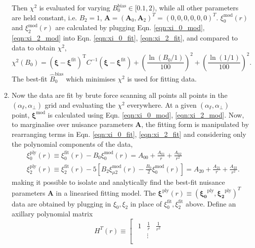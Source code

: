 \documentclass[fleqn,usenatbib]{mnras}
\begin{document}
\begin{enumerate}
			Then $\chi^2$ is evaluated for varying $B^\text{bias}_0 \in [0.1, 2)$, while all other parameters are held constant, i.e. $B_2=1$, $\bm{A} = (\bm{A}_0, \bm{A}_2)^T = (0, 0, 0, 0, 0, 0)^T$. $ \xi^\text{mod} _0 (r)$ and $\xi^\text{mod} _2 (r)$ are calculated by plugging Eqn. \ref{eqn:xi_0_mod}, \ref{eqn:xi_2_mod} into Eqn. \ref{eqn:xi_0_fit}, \ref{eqn:xi_2_fit}, and compared to data to obtain $\chi^2$,
			\begin{equation}
				\chi^2 (B_0) = (\bm{\xi} - \bm{\xi}^\text{fit})^\text{T} C^{-1} (\bm{\xi} - \bm{\xi}^\text{fit}) + \left( \frac{\ln(B_0/1)}{100} \right) ^2
				+ \left( \frac{\ln(1/1)}{100} \right) ^2 .
			\end{equation}
			The best-fit $\hat{B}^\text{bias}_0$ which minimises $\chi^2$ is used for fitting data.
			
			\item 
			Now the data are fit by brute force scanning all points all points in the $(\alpha_\varparallel, \alpha_\perp)$ grid and evaluating the $\chi^2$ everywhere. At a given $(\alpha_\varparallel, \alpha_\perp)$ point, $\bm{\xi}^\text{mod}$ is calculated using Eqn. \ref{eqn:xi_0_mod}, \ref{eqn:xi_2_mod}. Now, to marginalise over nuisance parameters $\bm{A}$, the fitting form is manipulated by rearranging terms in Eqn. \ref{eqn:xi_0_fit}, \ref{eqn:xi_2_fit} and considering only the polynomial components of the data,
			\begin{align}
				& \xi_0^\text{ply} (r) \equiv \xi _0^\text{fit} (r) - B_0 \xi_0^\text{mod}(r) =  A_{00} + \frac{A_{01}}{r} + \frac{A_{02}}{r^2} \\
				& \xi_2^\text{ply} (r) \equiv \xi _2^\text{fit} (r) - 5 \left[ B_2 \xi_{\mu 2}^\text{mod} (r) - \frac{B_0}{2} \xi_0^\text{mod}  (r) \right] = A_{20} + \frac{A_{21}}{r} + \frac{A_{22}}{r^2} .
			\end{align}
			making it possible to isolate and analytically find the best-fit nuisance parameters $\bm{A}$ in a linearised fitting model. The $\bm{\xi} ^\text{ply} (r) \equiv (\bm{\xi_0}^\text{ply}, \bm{\xi_2}^\text{ply} )^T$ data are obtained by plugging in $\xi_0, \xi_2$ in place of $\xi_0^\text{fit}, \xi_2^\text{fit}$ above. Define an axillary polynomial matrix
			\begin{equation}
				H^T (r) \equiv 
				\left[
					\begin{array}{c|c}
						\begin{matrix}
							1	& \frac{1}{r}	& \frac{1}{r^2} \\
								& \vdots		& \\

\end{matrix}
\end{array}
\end{equation}
\end{enumerate}
\end{document}
